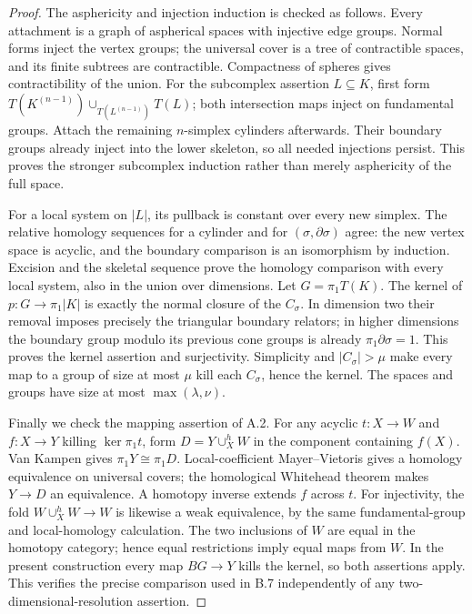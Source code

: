 \begin{proof}
The asphericity and injection induction is checked as follows.
Every attachment is a graph of aspherical spaces with injective edge
groups.  Normal forms inject the vertex groups; the universal cover
is a tree of contractible spaces, and its finite subtrees are
contractible.  Compactness of spheres gives contractibility of the
union.  For the subcomplex assertion $L\subseteq K$, first form
$T(K^{(n-1)})\cup_{T(L^{(n-1)})}T(L)$; both intersection maps inject
on fundamental groups.  Attach the remaining $n$-simplex cylinders
afterwards.  Their boundary groups already inject into the lower
skeleton, so all needed injections persist.  This proves the stronger
subcomplex induction rather than merely asphericity of the full space.

For a local system on $|L|$, its pullback is constant over every new
simplex.  The relative homology sequences for a cylinder and for
$(\sigma,\partial\sigma)$ agree: the new vertex space is acyclic,
and the boundary comparison is an isomorphism by induction.  Excision
and the skeletal sequence prove the homology comparison with every
local system, also in the union over dimensions.  Let $G=\pi_1T(K)$.
The kernel of $p:G\to\pi_1|K|$ is exactly the normal closure of the
$C_\sigma$.  In dimension two their removal imposes precisely the
triangular boundary relators; in higher dimensions the boundary group
modulo its previous cone groups is already
$\pi_1\partial\sigma=1$.  This proves the kernel assertion and
surjectivity.  Simplicity and $|C_\sigma|>\mu$ make every map to a
group of size at most $\mu$ kill each $C_\sigma$, hence the kernel.
The spaces and groups have size at most $\max(\lambda,\nu)$.

Finally we check the mapping assertion of A.2.  For any acyclic
$t:X\to W$ and $f:X\to Y$ killing $\ker\pi_1t$, form
$D=Y\cup_X^hW$ in the component containing $f(X)$.
Van Kampen gives $\pi_1Y\cong\pi_1D$.  Local-coefficient
Mayer--Vietoris gives a homology equivalence on universal covers;
the homological Whitehead theorem makes $Y\to D$ an equivalence.
A homotopy inverse extends $f$ across $t$.  For injectivity, the fold
$W\cup_X^hW\to W$ is likewise a weak equivalence, by the same
fundamental-group and local-homology calculation.  The two inclusions
of $W$ are equal in the homotopy category; hence equal restrictions
imply equal maps from $W$.  In the present construction every map
$BG\to Y$ kills the kernel, so both assertions apply.  This verifies
the precise comparison used in B.7 independently of any
two-dimensional-resolution assertion.
\end{proof}

